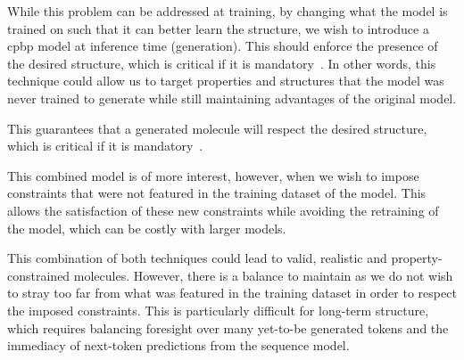 \documentclass[../Document.tex]{subfiles}
\begin{document}
While this problem can be addressed at training, by changing what the model is trained on such that it can better learn the structure, we wish to introduce a \gls{cpbp} model at inference time (generation). This should enforce the presence of the desired structure, which is critical if it is mandatory~\cite{deutsch2019general,lee2019gradient}.
In other words, this technique could allow us to target properties and structures that the model was never trained to generate while still maintaining advantages of the original model.


This guarantees that a generated molecule will respect the desired structure, which is critical if it is mandatory~\cite{deutsch2019general,lee2019gradient}.

This combined model is of more interest, however, when we wish to impose constraints that were not featured in the training dataset of the model. This allows the satisfaction of these new constraints while avoiding the retraining of the model, which can be costly with larger models.

This combination of both techniques could lead to valid, realistic and property-constrained molecules. However, there is a balance to maintain as we do not wish to stray too far from what was featured in the training dataset in order to respect the imposed constraints. This is particularly difficult for long-term structure, which requires balancing foresight over many yet-to-be generated tokens and the immediacy of next-token predictions from the sequence model.










\end{document}
